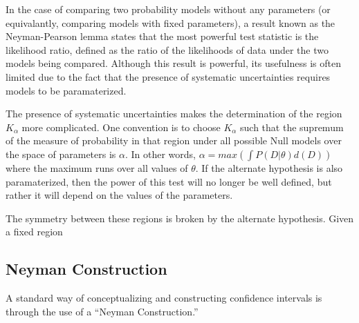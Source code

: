 In the case of comparing two probability models without any parameters (or equivalantly, comparing models with fixed parameters), a result known as the Neyman-Pearson lemma states that the most powerful test statistic is the likelihood ratio, defined as the ratio of the likelihoods of data under the two models being compared.
Although this result is powerful, its usefulness is often limited due to the fact that the presence of systematic uncertainties requires models to be paramaterized.

The presence of systematic uncertainties makes the determination of the region $K_{\alpha}$ more complicated.
One convention is to choose $K_{\alpha}$ such that the supremum of the measure of probability in that region under all possible Null models over the space of parameters is $\alpha$.
In other words, $\alpha = max( \int P(D|\theta) d(D) )$ where the maximum runs over all values of $\theta$.
If the alternate hypothesis is also paramaterized, then the power of this test will no longer be well defined, but rather it will depend on the values of the parameters.


The symmetry between these regions is broken by the alternate hypothesis.
Given a fixed region


\subsection{Neyman Construction}

A standard way of conceptualizing and constructing confidence intervals is through the use of a ``Neyman Construction.'' 



